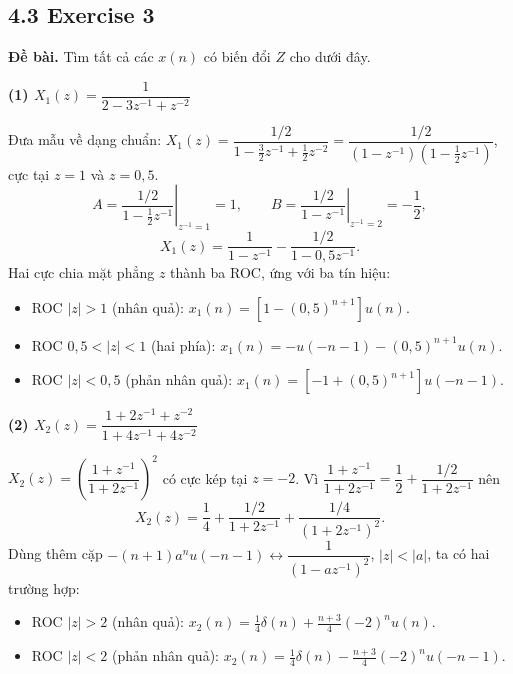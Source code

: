 \documentclass[12pt,a4paper]{article}
\begin{document}
\subsection*{4.3 Exercise 3}
\textbf{Đề bài.} Tìm tất cả các $x(n)$ có biến đổi $Z$ cho dưới đây.

\par\smallskip\noindent\textbf{(1) $X_1(z)=\dfrac{1}{2-3z^{-1}+z^{-2}}$}\par
Đưa mẫu về dạng chuẩn: $X_1(z)=\dfrac{1/2}{1-\frac32z^{-1}+\frac12z^{-2}}=\dfrac{1/2}{(1-z^{-1})(1-\frac12z^{-1})}$, cực tại $z=1$ và $z=0{,}5$.
\[
A=\left.\frac{1/2}{1-\frac12z^{-1}}\right|_{z^{-1}=1}=1,\qquad
B=\left.\frac{1/2}{1-z^{-1}}\right|_{z^{-1}=2}=-\frac12,
\]
\[
X_1(z)=\frac{1}{1-z^{-1}}-\frac{1/2}{1-0{,}5z^{-1}}.
\]
Hai cực chia mặt phẳng $z$ thành ba ROC, ứng với ba tín hiệu:
\begin{itemize}[leftmargin=*]
    \item ROC $|z|>1$ (nhân quả): $x_1(n)=\left[1-(0{,}5)^{n+1}\right]u(n)$.
    \item ROC $0{,}5<|z|<1$ (hai phía): $x_1(n)=-u(-n-1)-(0{,}5)^{n+1}u(n)$.
    \item ROC $|z|<0{,}5$ (phản nhân quả): $x_1(n)=\left[-1+(0{,}5)^{n+1}\right]u(-n-1)$.
\end{itemize}

\par\smallskip\noindent\textbf{(2) $X_2(z)=\dfrac{1+2z^{-1}+z^{-2}}{1+4z^{-1}+4z^{-2}}$}\par
$X_2(z)=\left(\dfrac{1+z^{-1}}{1+2z^{-1}}\right)^2$ có cực kép tại $z=-2$. Vì $\dfrac{1+z^{-1}}{1+2z^{-1}}=\dfrac12+\dfrac{1/2}{1+2z^{-1}}$ nên
\[
X_2(z)=\frac14+\frac{1/2}{1+2z^{-1}}+\frac{1/4}{(1+2z^{-1})^2}.
\]
Dùng thêm cặp $-(n+1)a^nu(-n-1)\leftrightarrow\dfrac{1}{(1-az^{-1})^2}$, $|z|<|a|$, ta có hai trường hợp:
\begin{itemize}[leftmargin=*]
    \item ROC $|z|>2$ (nhân quả): $x_2(n)=\tfrac14\delta(n)+\tfrac{n+3}{4}(-2)^nu(n)$.
    \item ROC $|z|<2$ (phản nhân quả): $x_2(n)=\tfrac14\delta(n)-\tfrac{n+3}{4}(-2)^nu(-n-1)$.
\end{itemize}
\end{document}
